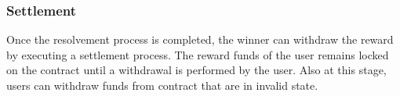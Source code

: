 \documentclass{article}
\begin{document}
	\subsubsection{Settlement}
	
	Once the resolvement process is completed, the winner can withdraw the reward by executing a settlement process. The reward funds of the user remains locked on the contract until a withdrawal is performed by the user. Also at this stage, users can withdraw funds from contract that are in invalid state.
	
	
%	
%	
%	
%	
%	
%	
%	
%	
%
%	
%	
%	
%	 
	 	 
\end{document}
